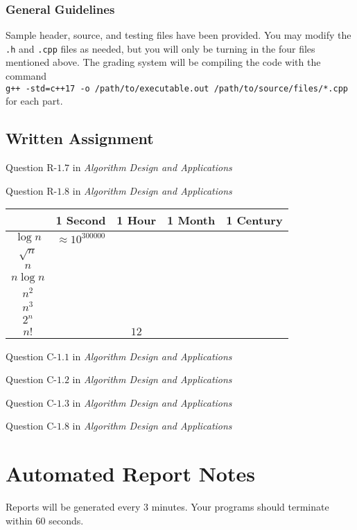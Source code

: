 \documentclass[addpoints,letter,11pt]{exam}
\begin{document}
\subsubsection*{General Guidelines}
Sample header, source, and testing files have been provided. You may modify the \verb+.h+ and \verb+.cpp+ files as needed, but you will only be turning in the four files mentioned above. The grading system will be compiling the code with the command\\ \verb|g++ -std=c++17 -o /path/to/executable.out /path/to/source/files/*.cpp| for each part. 

\subsection*{Written Assignment}
\begin{questions}
  \question[10]
  Question $\text{R-}1.7$ in \emph{Algorithm Design and Applications}

  \question[10]
  Question $\text{R-}1.8$ in \emph{Algorithm Design and Applications}
\begin{table}[h]
\begin{tabular}{|*{5}{c|}}
\hline
\hline
& 1 Second & 1 Hour & 1 Month & 1 Century\\
\hline
$\log n$ & $\approx 10^{300000}$ & & &\\
\hline
$\sqrt{n}$ & & & &\\
\hline
$n$ & & & &\\
\hline
$n\log n$ & & & &\\
\hline
$n^2$ & & & &\\
\hline
$n^3$ & & & &\\
\hline
$2^n$ & & & &\\
\hline
$n!$ & & $12$ & &\\
\hline
\hline
\end{tabular}
\end{table}

  \question[10]
  Question $\text{C-}1.1$ in \emph{Algorithm Design and Applications}

  \question[10]
  Question $\text{C-}1.2$ in \emph{Algorithm Design and Applications}

  \question[10]
  Question $\text{C-}1.3$ in \emph{Algorithm Design and Applications}

  \question[10]
  Question $\text{C-}1.8$ in \emph{Algorithm Design and Applications}
  \end{questions}

\section*{Automated Report Notes}
Reports will be generated every $3$ minutes. Your programs should terminate within $60$ seconds.
\end{document}
